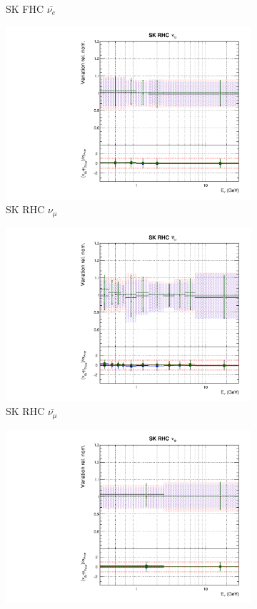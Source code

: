 \begin{figure}[t]
\begin{subfigure}{0.45\textwidth}
  \caption{SK FHC $\bar{\nu_e}$}
\end{subfigure}
\begin{subfigure}{0.45\textwidth}
  \centering
  \includegraphics[width=0.75\linewidth]{figs/hptpcfitsflux_12}
  \caption{SK RHC $\nu_{\mu}$}
\end{subfigure}
\begin{subfigure}{0.45\textwidth}
  \centering
  \includegraphics[width=0.75\linewidth]{figs/hptpcfitsflux_13}
  \caption{SK RHC $\bar{\nu_{\mu}}$}
\end{subfigure}
\begin{subfigure}{0.45\textwidth}
  \centering
  \includegraphics[width=0.75\linewidth]{figs/hptpcfitsflux_14}

\end{subfigure}
\end{figure}
